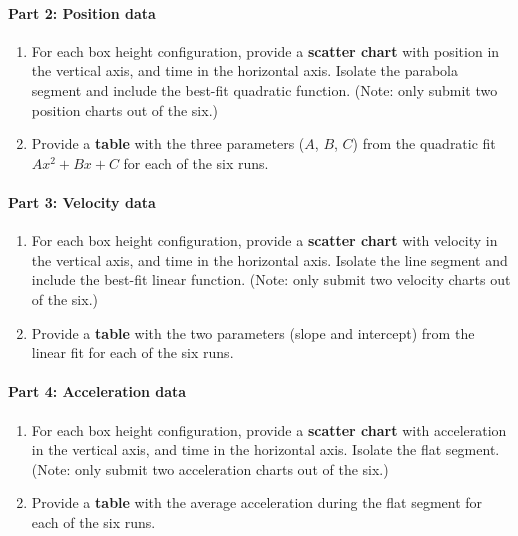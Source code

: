 \paragraph{Part 2: Position data}
%
\begin{enumerate}
    \item For each box height configuration, provide a \textbf{scatter chart} with position in the vertical axis, and time in the horizontal axis. Isolate the parabola segment and include the best-fit quadratic function. (Note: only submit two position charts out of the six.)
    \item Provide a \textbf{table} with the three parameters ($A$, $B$, $C$) from the quadratic fit $Ax^{2} + Bx + C$ for each of the six runs.
\end{enumerate}
%
\paragraph{Part 3: Velocity data}
%
\begin{enumerate}
    \item For each box height configuration, provide a \textbf{scatter chart} with velocity in the vertical axis, and time in the horizontal axis. Isolate the line segment and include the best-fit linear function. (Note: only submit two velocity charts out of the six.)
    \item Provide a \textbf{table} with the two parameters (slope and intercept) from the linear fit for each of the six runs.
\end{enumerate}
%
\paragraph{Part 4: Acceleration data}
%
\begin{enumerate}
    \item For each box height configuration, provide a \textbf{scatter chart} with acceleration in the vertical axis, and time in the horizontal axis. Isolate the flat segment. (Note: only submit two acceleration charts out of the six.)
    \item Provide a \textbf{table} with the average acceleration during the flat segment for each of the six runs.
\end{enumerate}
%
